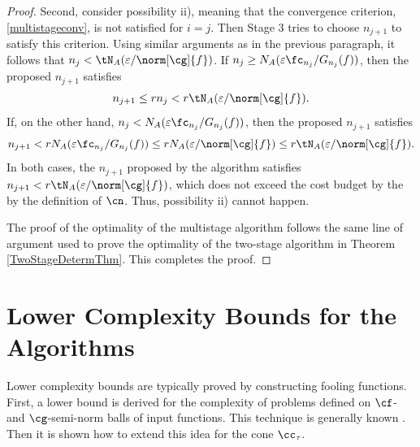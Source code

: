 \documentclass[]{elsarticle}
\theoremstyle{definition}
\theoremstyle{remark}
\begin{document}
\begin{proof}
Second, consider possibility ii), meaning that the convergence criterion, \eqref{multistageconv}, is not satisfied for $i=j$.  Then Stage 3 tries to choose $n_{j+1}$ to satisfy this criterion.  Using similar arguments as in the previous paragraph, it follows that $n_j < \tN_A(\varepsilon/\norm[\cg]{f})$. 
If $n_j \ge N_{A}(\varepsilon \fc_{n_j}/G_{n_j}(f))$, then the proposed $n_{j+1}$ satisfies
\begin{equation*}
n_{j+1} \le r  n_j < r \tN_{A}(\varepsilon/\norm[\cg]{f}).
\end{equation*}
If, on the other hand, $n_j < N_{A}(\varepsilon \fc_{n_j}/G_{n_j}(f))$, then the proposed $n_{j+1}$ satisfies
\begin{equation*}
n_{j+1} < r  N_{A}(\varepsilon \fc_{n_j}/G_{n_j}(f)) \le r  N_{A}(\varepsilon/\norm[\cg]{f}) \le r \tN_{A}(\varepsilon/\norm[\cg]{f}).
\end{equation*}
In both cases, the $n_{j+1}$ proposed by the algorithm satisfies $n_{j+1} < r \tN_{A}(\varepsilon/\norm[\cg]{f})$, which does not exceed the cost budget by the  by the definition of $\cn$.  Thus, possibility ii) cannot happen.

The proof of the optimality of the multistage algorithm follows the same line of argument used to prove the optimality of the two-stage algorithm in Theorem \ref{TwoStageDetermThm}.  This completes the proof.
\end{proof}

\section{Lower Complexity Bounds for the Algorithms} \label{LowBoundSec}
Lower complexity bounds are typically proved by constructing fooling functions.  First, a lower bound is derived for the complexity of problems defined on $\cf$- and $\cg$-semi-norm balls of input functions.  This technique is generally known \cite{???}.  Then it is shown how to extend this idea for the cone $\cc_{\tau}$.  
\end{document}
